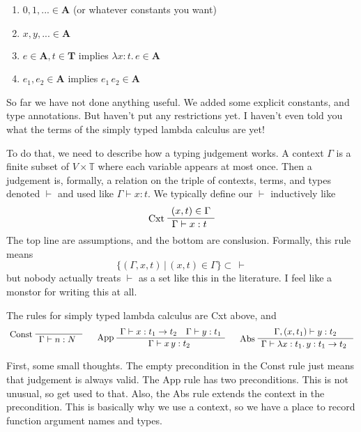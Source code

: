 \documentclass[12pt]{article}
\newenvironment{bprooftree}
  {\leavevmode\hbox\bgroup}
  {\DisplayProof\egroup}
\begin{document}
\begin{enumerate}
    \item $0,1,... \in \mathbf{A}$ (or whatever constants you want)
    \item $x,y,... \in \mathbf{A}$
    \item $e \in \mathbf{A}, t \in \mathbf{T}$ implies $\lambda x:t.\, e \in \mathbf{A}$
    \item $e_1, e_2 \in \mathbf{A}$ implies $e_1\, e_2 \in \mathbf{A}$
\end{enumerate}

So far we have not done anything useful.
We added some explicit constants, and type annotations. 
But haven't put any restrictions yet.
I haven't even told you what the terms of the simply typed lambda calculus are yet!

To do that, we need to describe how a typing judgement works.
A context $\Gamma$ is a finite subset of $V \times \mathbb{T}$ where each variable appears at most once.
Then a judgement is, formally, a relation on the triple of contexts, terms, and types denoted $\vdash$ and used like $\Gamma \vdash x : t$.
We typically define our $\vdash$ inductively like
\[
\begin{bprooftree}
\AxiomC{$(x,t) \in \Gamma$}
\LeftLabel{Cxt}
\UnaryInfC{$\Gamma \vdash x : t$ }
\end{bprooftree}
\]
The top line are assumptions, and the bottom are conslusion.
Formally, this rule means 
\[
   \{(\Gamma, x, t) \,|\, (x,t) \in \Gamma\} \subset\, \vdash
\]
but nobody actually treats $\vdash$ as a set like this in the literature.
I feel like a monstor for writing this at all.

The rules for simply typed lambda calculus are Cxt above, and
\[
\begin{bprooftree}
\AxiomC{}
\LeftLabel{Const}
\UnaryInfC{$\Gamma \vdash n : N$ }
\end{bprooftree}\quad
\begin{bprooftree}
\AxiomC{$\Gamma \vdash x : t_1 \rightarrow t_2 \quad \Gamma \vdash y : t_1$}
\LeftLabel{App}
\UnaryInfC{$\Gamma \vdash x\, y : t_2$ }
\end{bprooftree}\quad
\begin{bprooftree}
\AxiomC{$\Gamma, (x,t_1) \vdash y : t_2$}
\LeftLabel{Abs}
\UnaryInfC{$\Gamma \vdash \lambda x:t_1.\, y : t_1 \rightarrow t_2$ }
\end{bprooftree}
\]

First, some small thoughts.
The empty precondition in the Const rule just means that judgement is always valid.
The App rule has two preconditions.
This is not unusual, so get used to that.
Also, the Abs rule extends the context in the precondition.
This is basically why we use a context, so we have a place to record function argument names and types.
\end{document}

